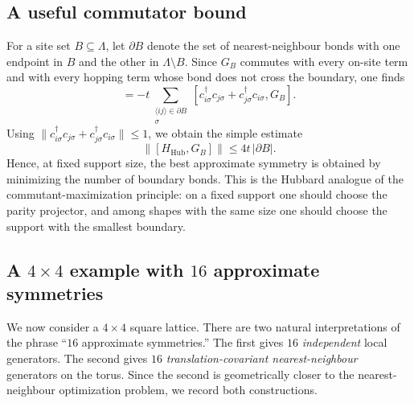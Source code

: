 \documentclass[11pt]{article}
\theoremstyle{definition}
\theoremstyle{remark}
\begin{document}
\subsection{A useful commutator bound}
For a site set $B\subseteq \Lambda$, let $\partial B$ denote the set of nearest-neighbour bonds with one endpoint in $B$ and the other in $\Lambda\setminus B$. Since $G_B$ commutes with every on-site term and with every hopping term whose bond does not cross the boundary, one finds
\begin{equation}
  [H_{\mathrm{Hub}},G_B]
  =
  -t\sum_{\substack{\langle ij\rangle\in \partial B\\ \sigma}}
  [c_{i\sigma}^\dagger c_{j\sigma}+c_{j\sigma}^\dagger c_{i\sigma},G_B].
\end{equation}
Using $\|c_{i\sigma}^\dagger c_{j\sigma}+c_{j\sigma}^\dagger c_{i\sigma}\|\le 1$, we obtain the simple estimate
\begin{equation}
  \|[H_{\mathrm{Hub}},G_B]\|
  \le 4t\,|\partial B|.
  \label{eq:boundary-bound}
\end{equation}
Hence, at fixed support size, the best approximate symmetry is obtained by minimizing the number of boundary bonds. This is the Hubbard analogue of the commutant-maximization principle: on a fixed support one should choose the parity projector, and among shapes with the same size one should choose the support with the smallest boundary.

\subsection{A $4\times 4$ example with $16$ approximate symmetries}
We now consider a $4\times 4$ square lattice. There are two natural interpretations of the phrase ``$16$ approximate symmetries.'' The first gives $16$ \emph{independent} local generators. The second gives $16$ \emph{translation-covariant nearest-neighbour} generators on the torus. Since the second is geometrically closer to the nearest-neighbour optimization problem, we record both constructions.
\end{document}
